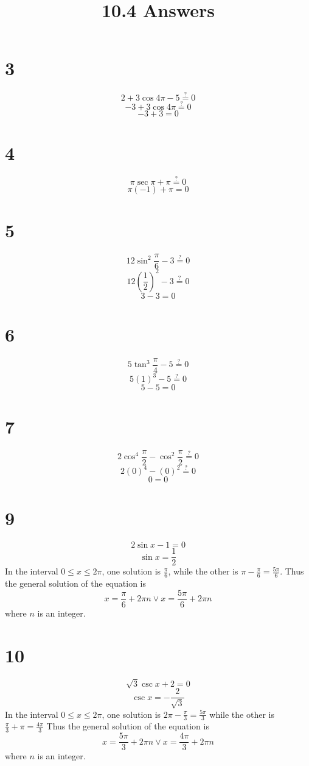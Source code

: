 \documentclass{article}
\title{10.4 Answers}
\theoremstyle{definition}
\newcommand{\?}{\stackrel{?}{=}}
\begin{document}
\maketitle

\section*{3}
\[ 2+3\cos 4\pi-5\? 0 \]
\[ -3+3\cos 4\pi\? 0 \]
\[ -3+3=0 \]

\section*{4}
\[ \pi\sec\pi+\pi\? 0 \]
\[ \pi(-1)+\pi =0 \]

\section*{5}
\[ 12\sin^2\frac{\pi}{6}-3\? 0 \]
\[ 12(\frac{1}{2})^2-3\? 0 \]
\[ 3-3=0 \]

\section*{6}
\[ 5\tan^3\frac{\pi}{4}-5\? 0 \]
\[ 5(1)^3-5\? 0 \]
\[ 5-5=0 \]

\section*{7}
\[ 2\cos^4\frac{\pi}{2}-\cos^2\frac{\pi}{2}\? 0 \]
\[ 2(0)^4-(0)^2\? 0 \]
\[ 0=0 \]

\section*{9}
\[ 2\sin x-1=0 \]
\[ \sin x=\frac{1}{2} \]
In the interval $0\le x\le 2\pi$, one solution is $\frac{\pi}{6}$, while the other is $\pi-\frac{\pi}{6}=\frac{5\pi}{6}$. Thus the general solution of the equation 
is \[ x=\frac{\pi}{6}+2\pi n\vee x=\frac{5\pi}{6}+2\pi n \] where $n$ is an integer.

\section*{10}
\[ \sqrt{3}\csc x+2=0 \]
\[ \csc x=-\frac{2}{\sqrt{3}} \]
In the interval $0\le x\le 2\pi$, one solution is $2\pi-\frac{\pi}{3}=\frac{5\pi}{3}$ 
while the other is $\frac{\pi}{3}+\pi=\frac{4\pi}{3}$ Thus the general solution of the equation is
\[ x=\frac{5\pi}{3}+2\pi n\vee x=\frac{4\pi}{3}+2\pi n \] where $n$ is an integer.
\end{document}
